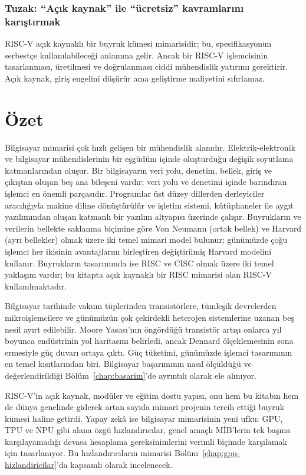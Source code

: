 \subsubsection*{Tuzak: ``Açık kaynak'' ile ``ücretsiz'' kavramlarını karıştırmak}
RISC-V açık kaynaklı bir buyruk kümesi mimarisidir; bu, spesifikasyonun serbestçe kullanılabileceği anlamına gelir. Ancak bir RISC-V işlemcisinin tasarlanması, üretilmesi ve doğrulanması ciddi mühendislik yatırımı gerektirir. Açık kaynak, giriş engelini düşürür ama geliştirme maliyetini sıfırlamaz.


\section{Özet}
\label{sec:giris-ozet}

Bilgisayar mimarisi çok hızlı gelişen bir mühendislik alanıdır. Elektrik-elektronik ve bilgisayar mühendislerinin bir eşgüdüm içinde oluşturduğu değişik soyutlama katmanlarından oluşur. Bir bilgisayarın veri yolu, denetim, bellek, giriş ve çıkıştan oluşan beş ana bileşeni vardır; veri yolu ve denetimi içinde barındıran işlemci en önemli parçasıdır. Programlar üst düzey dillerden derleyiciler aracılığıyla makine diline dönüştürülür ve işletim sistemi, kütüphaneler ile aygıt yazılımından oluşan katmanlı bir yazılım altyapısı üzerinde çalışır. Buyrukların ve verilerin bellekte saklanma biçimine göre Von Neumann (ortak bellek) ve Harvard (ayrı bellekler) olmak üzere iki temel mimari model bulunur; günümüzde çoğu işlemci her ikisinin avantajlarını birleştiren değiştirilmiş Harvard modelini kullanır. Buyrukların tasarımında ise RISC ve CISC olmak üzere iki temel yaklaşım vardır; bu kitapta açık kaynaklı bir RISC mimarisi olan RISC-V kullanılmaktadır.

Bilgisayar tarihinde vakum tüplerinden transistörlere, tümleşik devrelerden mikroişlemcilere ve günümüzün çok çekirdekli heterojen sistemlerine uzanan beş nesil ayırt edilebilir. Moore Yasası'nın öngördüğü transistör artışı onlarca yıl boyunca endüstrinin yol haritasını belirledi, ancak Dennard ölçeklemesinin sona ermesiyle güç duvarı ortaya çıktı. Güç tüketimi, günümüzde işlemci tasarımının en temel kısıtlarından biri. Bilgisayar başarımının nasıl ölçüldüğü ve değerlendirildiği Bölüm~\ref{chap:basarim}'de ayrıntılı olarak ele alınıyor.

RISC-V'in açık kaynak, modüler ve eğitim dostu yapısı, onu hem bu kitabın hem de dünya genelinde giderek artan sayıda mimari projenin tercih ettiği buyruk kümesi haline getirdi. Yapay zekâ ise bilgisayar mimarisinin yeni ufku: GPU, TPU ve NPU gibi alana özgü hızlandırıcılar, genel amaçlı MİB'lerin tek başına karşılayamadığı devasa hesaplama gereksinimlerini verimli biçimde karşılamak için tasarlanıyor. Bu hızlandırıcıların mimarisi Bölüm~\ref{chap:gpu-hizlandiricilar}'da kapsamlı olarak incelenecek.


